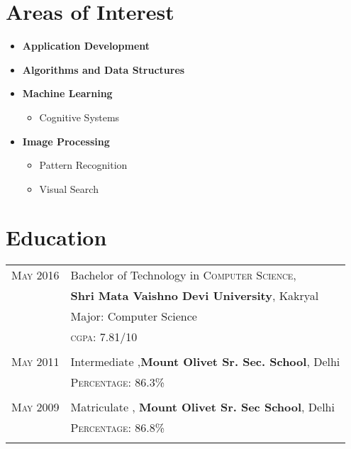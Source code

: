 \documentclass[a4paper,10pt]{article}
\begin{document}
\section{Areas of Interest}
\begin{itemize}
  \item {\large\textbf{Application Development}}
  \item {\large\textbf{Algorithms and Data Structures}}
  \item {\large\textbf{Machine Learning}}
  \begin{itemize}
    \item Cognitive Systems
  \end{itemize}
  \item {\large\textbf{Image Processing}}
  \begin{itemize}
    \item Pattern Recognition
    \item Visual Search
  \end{itemize}
\end{itemize}




\section{Education}
\begin{tabular}{rl}	
 \textsc{May} 2016 & Bachelor of Technology in \textsc{Computer Science, }\\& \textbf{Shri Mata Vaishno Devi University}, Kakryal\\
& Major: Computer Science\\
&\normalsize \textsc{cgpa}: 7.81/10 \\ & \\
\textsc{May} 2011& Intermediate  ,\normalsize\textbf{Mount Olivet Sr. Sec. School}, Delhi\\
&\normalsize \textsc{Percentage}: 86.3\% \\&\\
\textsc{May} 2009& Matriculate , \textbf{Mount Olivet Sr. Sec School}, Delhi\\
&\textsc{Percentage}: 86.8\% \\&\\
\end{tabular}

\end{document}
